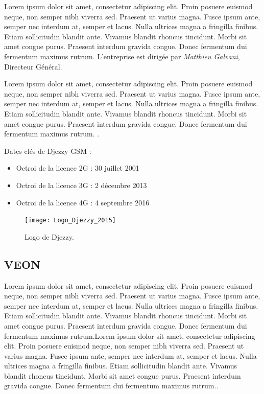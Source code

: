Lorem ipsum dolor sit amet, consectetur adipiscing elit. Proin posuere euismod neque, non semper nibh viverra sed. Praesent ut varius magna. Fusce ipsum ante, semper nec interdum at, semper et lacus. Nulla ultrices magna a fringilla finibus. Etiam sollicitudin blandit ante. Vivamus blandit rhoncus tincidunt. Morbi sit amet congue purus. Praesent interdum gravida congue. Donec fermentum dui fermentum maximus rutrum. L’entreprise est dirigée par \textit{Matthieu Galvani}, Directeur Général.

\medskip

Lorem ipsum dolor sit amet, consectetur adipiscing elit. Proin posuere euismod neque, non semper nibh viverra sed. Praesent ut varius magna. Fusce ipsum ante, semper nec interdum at, semper et lacus. Nulla ultrices magna a fringilla finibus. Etiam sollicitudin blandit ante. Vivamus blandit rhoncus tincidunt. Morbi sit amet congue purus. Praesent interdum gravida congue. Donec fermentum dui fermentum maximus rutrum. \parencite{djezzy_propos_2019}.

Dates clés de Djezzy GSM :
\begin{itemize}
  \item  Octroi de la licence 2G : 30 juillet 2001
  \item  Octroi de la licence 3G : 2 décembre 2013
  \item  Octroi de la licence 4G : 4 septembre 2016
\end{itemize}


\begin{figure}[hbt!]
  \centering
  \texttt{[image: Logo\_Djezzy\_2015]}
  \caption{Logo de Djezzy.}
  \label{fig:logo-djezzy}
\end{figure}
\FloatBarrier

\subsection{VEON}
Lorem ipsum dolor sit amet, consectetur adipiscing elit. Proin posuere euismod neque, non semper nibh viverra sed. Praesent ut varius magna. Fusce ipsum ante, semper nec interdum at, semper et lacus. Nulla ultrices magna a fringilla finibus. Etiam sollicitudin blandit ante. Vivamus blandit rhoncus tincidunt. Morbi sit amet congue purus. Praesent interdum gravida congue. Donec fermentum dui fermentum maximus rutrum.Lorem ipsum dolor sit amet, consectetur adipiscing elit. Proin posuere euismod neque, non semper nibh viverra sed. Praesent ut varius magna. Fusce ipsum ante, semper nec interdum at, semper et lacus. Nulla ultrices magna a fringilla finibus. Etiam sollicitudin blandit ante. Vivamus blandit rhoncus tincidunt. Morbi sit amet congue purus. Praesent interdum gravida congue. Donec fermentum dui fermentum maximus rutrum.\parencite{djezzy_propos_2019}.

